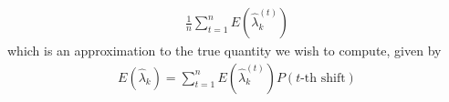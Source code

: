 \documentclass[12pt]{article}
\newcommand{\Gl}{\lambda}    \newcommand{\GL}{\Lambda}
\begin{document}
\begin{appendices}
\begin{eqnarray}
\label{eq:TIapproxexp}\frac{1}{n}\sum_{t=1}^n E(\hat{\Gl}_k^{(t)})
\end{eqnarray}
which is an approximation to the true quantity we wish to compute, given by
\begin{eqnarray}
E(\hat{\Gl}_k)=\sum_{t=1}^n E(\hat{\Gl}_k^{(t)})P(\mbox{$t$-th shift})
\end{eqnarray}
\end{appendices}
\end{document}
